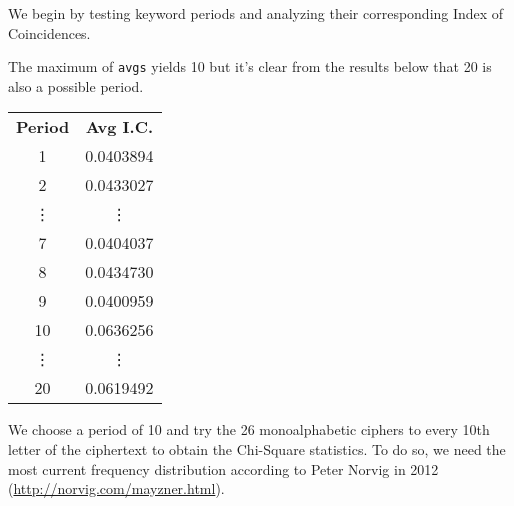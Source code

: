 \documentclass[../hw_sols.tex]{subfiles}
\begin{document}
\begin{solution}
We begin by testing keyword periods and analyzing their corresponding Index of Coincidences.



\newpage

\noindent The maximum of \verb|avgs| yields 10 but it's clear from the results below that 20 is also a possible period.

\begin{minipage}{0.25\linewidth}
	\begin{tabular}{ c c }
		\textbf{Period} & \textbf{Avg I.C.} \\
		1 & 0.0403894 \\
		2 & 0.0433027 \\
		\vdots & \vdots \\
		7 & 0.0404037 \\
		8 & 0.0434730 \\
		9 & 0.0400959 \\
		\rowcolor{yellow!75} 10 & 0.0636256 \\
		\vdots & \vdots \\
		\rowcolor{yellow!75} 20 & 0.0619492
	\end{tabular}
\end{minipage}
\begin{minipage}{0.7\linewidth}
\end{minipage}

\vspace{0.5cm}

\noindent We choose a period of 10 and try the 26 monoalphabetic ciphers to every 10th letter of the ciphertext to obtain the Chi-Square statistics. To do so, we need the most current frequency distribution according to Peter Norvig in 2012 (\url{http://norvig.com/mayzner.html}).




\end{solution}
\end{document}
